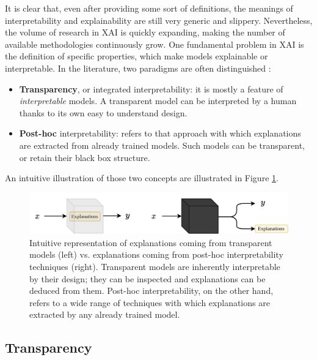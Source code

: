 It is clear that, even after providing some sort of definitions, the meanings of interpretability and explainability are still very generic and slippery. Nevertheless, the volume of research in XAI is quickly expanding, making the number of available methodologies continuously grow. 
One fundamental problem in XAI is the definition of specific properties, which make models explainable or interpretable. In the literature, two paradigms are often distinguished \cite{dosilovic2018explainable, lipton2017mythos}: 
\begin{itemize}
	\item \textbf{Transparency}, or integrated interpretability: it is mostly a feature of \textit{interpretable} models. A transparent model can be interpreted by a human thanks to its own easy to understand design. 
	\item \textbf{Post-hoc} interpretability: refers to that approach with which explanations are extracted from already trained models. Such models can be transparent, or retain their black box structure.
\end{itemize}

An intuitive illustration of those two concepts are illustrated in Figure \ref{fig:transparencyvsposthoc}.

\begin{figure}
	\centering
	\includegraphics[width=\linewidth]{figures/trasparency_vs_posthoc.drawio.png}
	\caption{Intuitive representation of explanations coming from transparent models (left) vs. explanations coming from post-hoc interpretability techniques (right). Transparent models are inherently interpretable by their design; they can be inspected and explanations can be deduced from them. Post-hoc interpretability, on the other hand, refers to a wide range of techniques with which explanations are extracted by any already trained model. }
	\label{fig:transparencyvsposthoc}
\end{figure}

\subsection{Transparency}

